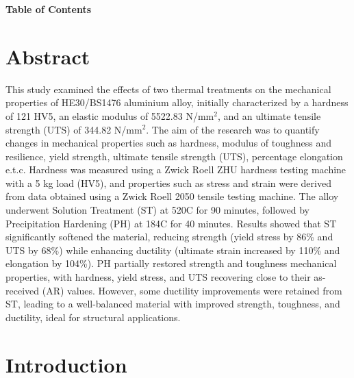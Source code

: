 \documentclass{article}
\begin{document}
    \normalsize
    \newpage
    \noindent\vspace*{1em}
    \begin{center}
        \LARGE \textbf{Table of Contents}\\[-0.5em]
    \end{center}
    {
        \hypersetup{linkcolor=black}
        \tableofcontents
    }    


    \large\newpage\vspace*{-20pt}

    \section{Abstract}
    \vspace*{1em}
    This study examined the effects of two thermal treatments on the mechanical properties of HE30/BS1476 aluminium alloy, initially characterized by a hardness of 121 HV5, an elastic modulus of 5522.83 N/\(\text{mm}^2\), and an ultimate tensile strength (UTS) of 344.82 N/\(\text{mm}^2\). The aim of the research was to quantify changes in mechanical properties such as hardness, modulus of toughness and resilience, yield strength, ultimate tensile strength (UTS), percentage elongation e.t.c. Hardness was measured using a Zwick Roell ZHU hardness testing machine with a 5 kg load (HV5), and properties such as stress and strain were derived from data obtained using a Zwick Roell 2050 tensile testing machine. The alloy underwent Solution Treatment (ST) at 520\textdegree C for 90 minutes, followed by Precipitation Hardening (PH) at 184\textdegree C for 40 minutes. Results showed that ST significantly softened the material, reducing strength (yield stress by 86\% and UTS by 68\%) while enhancing ductility (ultimate strain increased by 110\% and elongation by 104\%). PH partially restored strength and toughness mechanical properties, with hardness, yield stress, and UTS recovering close to their as-received (AR) values. However, some ductility improvements were retained from ST, leading to a well-balanced material with improved strength, toughness, and ductility, ideal for structural applications.
   
    
    \newpage\vspace*{-20pt}
\section{Introduction}
\end{document}

